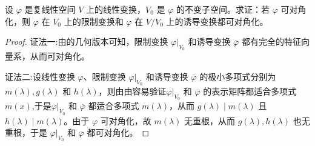 \documentclass[../../main.tex]{subfiles}%
\begin{document}
\begin{proposition}\label{proposition:可对角化的线性变换其限制变换和诱导变换也可对角化}
设 $\varphi$ 是复线性空间 $V$ 上的线性变换，$V_0$ 是 $\varphi$ 的不变子空间。求证：若 $\varphi$ 可对角化，则 $\varphi$ 在 $V_0$ 上的限制变换和 $\varphi$ 在 $V/V_0$ 上的诱导变换都可对角化。
\end{proposition}
\begin{proof}

{\color{blue}证法一:}由的几何版本可知，限制变换 $\varphi|_{V_0}$ 和诱导变换 $\overline{\varphi}$ 都有完全的特征向量系，从而可对角化。

{\color{blue}证法二:}设线性变换 $\varphi$、限制变换 $\varphi|_{V_0}$ 和诱导变换 $\overline{\varphi}$ 的极小多项式分别为 $m(\lambda),g(\lambda)$ 和 $h(\lambda)$，则由由容易验证$\varphi|_{V_0}$ 和 $\overline{\varphi}$ 的表示矩阵都适合多项式$m(x)$,于是$\varphi|_{V_0}$ 和 $\overline{\varphi}$ 都适合多项式 $m(\lambda)$，从而 $g(\lambda)\mid m(\lambda)$ 且 $h(\lambda)\mid m(\lambda)$。由于 $\varphi$ 可对角化，故 $m(\lambda)$ 无重根，从而 $g(\lambda),h(\lambda)$ 也无重根，于是 $\varphi|_{V_0}$ 和 $\overline{\varphi}$ 都可对角化。
\end{proof}
\end{document}

